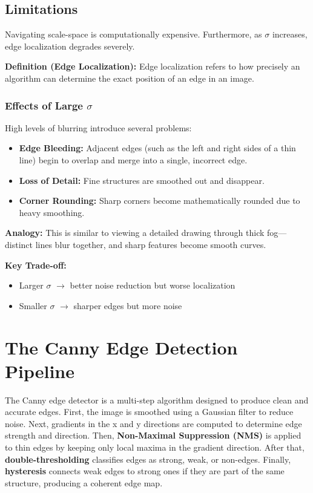 \documentclass[12pt]{article}
\begin{document}
\subsection{Limitations}

Navigating scale-space is computationally expensive. Furthermore, as $\sigma$ increases, edge localization degrades severely.

\textbf{Definition (Edge Localization):}
Edge localization refers to how precisely an algorithm can determine the exact position of an edge in an image.

\subsubsection*{Effects of Large $\sigma$}

High levels of blurring introduce several problems:

\begin{itemize}
    \item \textbf{Edge Bleeding:}
          Adjacent edges (such as the left and right sides of a thin line) begin to overlap and merge into a single, incorrect edge.

    \item \textbf{Loss of Detail:}
          Fine structures are smoothed out and disappear.

    \item \textbf{Corner Rounding:}
          Sharp corners become mathematically rounded due to heavy smoothing.
\end{itemize}

\textbf{Analogy:}
This is similar to viewing a detailed drawing through thick fog—distinct lines blur together, and sharp features become smooth curves.

\textbf{Key Trade-off:}
\begin{itemize}
    \item Larger $\sigma$ $\rightarrow$ better noise reduction but worse localization
    \item Smaller $\sigma$ $\rightarrow$ sharper edges but more noise
\end{itemize}



\section{The Canny Edge Detection Pipeline}
The Canny edge detector is a multi-step algorithm designed to produce clean and accurate edges. First, the image is smoothed using a Gaussian filter to reduce noise. Next, gradients in the x and y directions are computed to determine edge strength and direction. Then, \textbf{Non-Maximal Suppression (NMS)} is applied to thin edges by keeping only local maxima in the gradient direction. After that, \textbf{double-thresholding} classifies edges as strong, weak, or non-edges. Finally, \textbf{hysteresis} connects weak edges to strong ones if they are part of the same structure, producing a coherent edge map.
\end{document}
